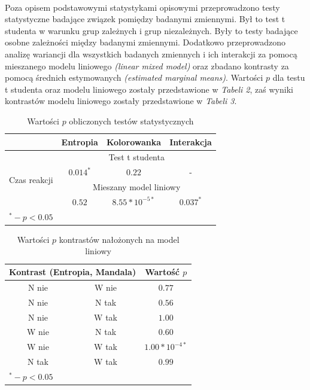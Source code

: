 \documentclass[12pt,a4paper,final,oneside,onecolumn,titlepage]{article}
\begin{document}
\paragraph{}
Poza opisem podstawowymi statystykami opisowymi przeprowadzono testy statystyczne badające związek pomiędzy badanymi zmiennymi. Był to test t studenta w warunku grup zależnych i grup niezależnych. Były to testy badające osobne zależności między badanymi zmiennymi. Dodatkowo przeprowadzono analizę wariancji dla wszystkich badanych zmiennych i ich interakcji za pomocą mieszanego modelu liniowego \textit{(linear mixed model)} oraz zbadano kontrasty za pomocą średnich estymowanych \textit{(estimated marginal means)}. Wartości $p$ dla testu t studenta oraz modelu liniowego zostały przedstawione w \textit{Tabeli 2}, zaś wyniki kontrastów modelu liniowego zostały przedstawione w \textit{Tabeli 3}.
\begin{table}[H]
\caption{Wartości $p$ obliczonych testów statystycznych}
\centering
\begin{tabular}{l c c c}
\hline\hline
 & Entropia & Kolorowanka & Interakcja \\ [0.5ex]
\hline
\multirow{4}{*}{Czas reakcji}& \multicolumn{3}{c}{Test t studenta} \\
 &$0.014^*$&$0.22$&- \\ [3ex]
 & \multicolumn{3}{c}{Mieszany model liniowy}\\
 &$0.52$&$8.55*10^{-5*}$&$0.037^*$ \\
\hline
\multicolumn{4}{l}{\footnotesize{$^{*} - p<0.05$}}
\end{tabular}
\label{Tabela}
\end{table}
\begin{table}[H]
\caption{Wartości $p$ kontrastów nałożonych na model liniowy}
\centering
\begin{tabular}{c c c}
\hline\hline
\multicolumn{2}{c}{Kontrast (Entropia, Mandala)} & Wartość $p$ \\ [0.5ex]
\hline
N nie & W nie & $0.77$ \\
N nie & N tak & $0.56$ \\
N nie & W tak & $1.00$ \\
W nie & N tak & $0.60$ \\
W nie & W tak & $1.00*10^{-4*}$ \\
N tak & W tak & $0.99$ \\
\hline
\multicolumn{3}{l}{\footnotesize{$^{*} - p<0.05$}}
\end{tabular}
\label{Tabela}
\end{table}
\end{document}
